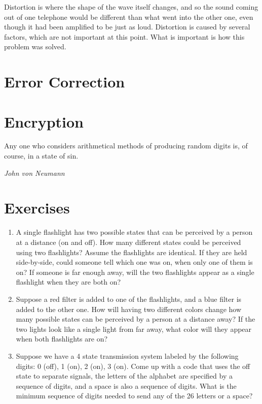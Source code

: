 Distortion is where the shape of the wave itself changes, and so the sound coming out of one telephone would be different than what went into the other one, even though it had been amplified to be just as loud. Distortion is caused by several factors, which are not important at this point. What is important is how this problem was solved.\\




\section{Error Correction}

\begin{center}\end{center}

\section{Encryption}

\epigraph{Any one who considers arithmetical methods of producing random digits is, of course, in a state of sin.}{\textit{John von Neumann}}

\section{Exercises}

\begin{enumerate}
	\item A single flashlight has two possible states that can be perceived by a person at a distance (on and off). How many different states could be perceived using two flashlights? Assume the flashlights are identical. If they are held side-by-side, could someone tell which one was on, when only one of them is on? If someone is far enough away, will the two flashlights appear as a single flashlight when they are both on?
	
	\item Suppose a red filter is added to one of the flashlights, and a blue filter is added to the other one. How will having two different colors change how many possible states can be perceived by a person at a distance away? If the two lights look like a single light from far away, what color will they appear when both flashlights are on?
	
	\item Suppose we have a 4 state transmission system labeled by the following digits: 0 (off), 1 (on), 2 (on), 3 (on). Come up with a code that uses the off state to separate signals, the letters of the alphabet are specified by a sequence of digits, and a space is also a sequence of digits. What is the minimum sequence of digits needed to send any of the 26 letters or a space? 
\end{enumerate}